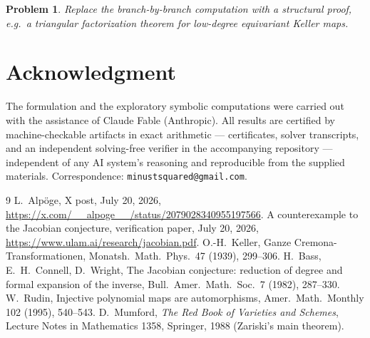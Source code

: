 \documentclass[11pt]{article}
\newtheorem{problem}[theorem]{Problem}
\begin{document}
\begin{problem}
Replace the branch-by-branch computation with a structural proof, e.g.\ a
triangular factorization theorem for low-degree equivariant Keller maps.
\end{problem}

\section*{Acknowledgment}

The formulation and the exploratory symbolic computations were carried out
with the assistance of Claude Fable (Anthropic). All results are certified
by machine-checkable artifacts in exact arithmetic --- certificates, solver
transcripts, and an independent solving-free verifier in the accompanying
repository --- independent of any AI system's reasoning and reproducible
from the supplied materials. Correspondence: \texttt{minustsquared@gmail.com}.

\begin{thebibliography}{9}
 L.~Alp\"oge, X post, July 20, 2026,
\url{https://x.com/__alpoge__/status/2079028340955197566}.
 A counterexample to the Jacobian conjecture, verification
paper, July 20, 2026, \url{https://www.ulam.ai/research/jacobian.pdf}.
 O.-H.~Keller, Ganze Cremona-Transformationen,
Monatsh.\ Math.\ Phys.\ 47 (1939), 299--306.
 H.~Bass, E.~H.~Connell, D.~Wright, The Jacobian conjecture:
reduction of degree and formal expansion of the inverse, Bull.\ Amer.\ Math.\
Soc.\ 7 (1982), 287--330.
 W.~Rudin, Injective polynomial maps are automorphisms,
Amer.\ Math.\ Monthly 102 (1995), 540--543.
 D.~Mumford, \emph{The Red Book of Varieties and Schemes},
Lecture Notes in Mathematics 1358, Springer, 1988 (Zariski's main theorem).
\end{thebibliography}
\end{document}
